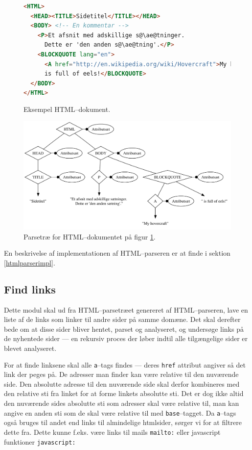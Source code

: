 \documentclass[a4paper,oneside]{memoir}
\begin{document}
\begin{figure}
\begin{lstlisting}[language=HTML,
                   escapechar=\@]
<HTML>
  <HEAD><TITLE>Sidetitel</TITLE></HEAD>
  <BODY> <!-- En kommentar -->
    <P>Et afsnit med adskillige s@\ae@tninger.
      Dette er 'den anden s@\ae@tning'.</P>
    <BLOCKQUOTE lang="en">
      <A href="http://en.wikipedia.org/wiki/Hovercraft">My hovercraft</A>
      is full of eels!</BLOCKQUOTE>
  </BODY>
</HTML>
\end{lstlisting}

  \caption{Eksempel HTML--dokument.}
  \label{htmldoc1}
\end{figure}

\begin{figure}
  \includegraphics[width=\textwidth]{parsetree.pdf}
  \caption{Parsetræ for HTML--dokumentet på figur \ref{htmldoc1}.}
  \label{parsetree}
\end{figure}

En beskrivelse af implementationen af HTML--parseren er at finde i
sektion \ref{htmlparserimpl}.

\subsection{Find links}
Dette modul skal ud fra HTML--parsetræet genereret af HTML--parseren,
lave en liste af de links som linker til andre sider på samme domæne.
Det skal derefter bede om at disse sider bliver hentet, parset og
analyseret, og undersøge links på de nyhentede sider --- en rekursiv
proces der løber indtil alle tilgængelige sider er blevet analyseret.

For at finde linksene skal alle \texttt{a}--tags findes --- deres
\texttt{href} attribut angiver så det link der peges på. De adresser
man finder kan være relative til den nuværende side. Den absolutte
adresse til den nuværende side skal derfor kombineres med den relative
sti fra linket for at forme linkets absolutte sti. Det er dog ikke
altid den nuværende sides absolutte sti som adresser skal være
relative til, man kan angive en anden sti som de skal være relative
til med \texttt{base}--tagget. Da \texttt{a}--tags også bruges til andet 
end links til almindelige htmlsider, sørger vi for at filtrere dette fra. 
Dette kunne f.eks. være links til mails \texttt{mailto:} eller javascript
funktioner \texttt{javascript:}
\end{document}
